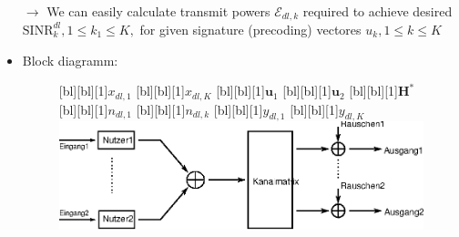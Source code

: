\documentclass[a4paper, 10pt]{article}
\begin{document}
\begin{itemize}
\begin{align*}
	\end{align*}
	\item[$\rightarrow$] We can easily calculate transmit powers $\mathcal{E}_{dl,k} $ required to achieve desired $\text{SINR}_k^{dl}, 1\leq k_1\leq K, $ for given signature (precoding) vectores $u_k, 1\leq k\leq K $ 
	\item Block diagramm: 
	\begin{figure}[ht]
		\centering	
		[bl][bl][1]{$x_{dl,1} $}
		[bl][bl][1]{$x_{dl,K} $}
		[bl][bl][1]{$\mathbf{u}_1 $}
		[bl][bl][1]{$\mathbf{u}_2 $}
		[bl][bl][1]{$\mathbf{H}^* $}
		[bl][bl][1]{$n_{dl,1} $}
		[bl][bl][1]{$n_{dl,k} $}
		[bl][bl][1]{$y_{dl,1} $}
		[bl][bl][1]{$y_{dl,K} $}
		\includegraphics[scale=0.8]{Downlink_MIMO}		
	\end{figure}
\end{itemize}
\end{document}
